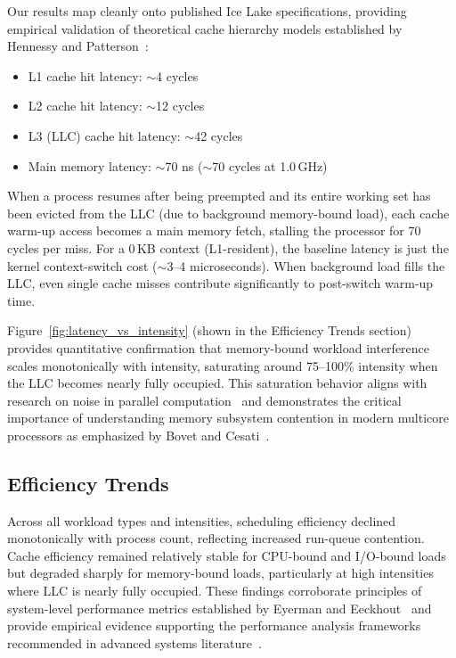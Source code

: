 \documentclass[conference]{IEEEtran}
\begin{document}
Our results map cleanly onto published Ice Lake specifications, providing
empirical validation of theoretical cache hierarchy models established by
Hennessy and Patterson~\cite{hennessy2019computer}:

\begin{itemize}
  \item L1 cache hit latency: $\sim$4 cycles
  \item L2 cache hit latency: $\sim$12 cycles
  \item L3 (LLC) cache hit latency: $\sim$42 cycles
  \item Main memory latency: $\sim$70 ns ($\sim$70 cycles at 1.0\,GHz)
\end{itemize}

When a process resumes after being preempted and its entire working set has
been evicted from the LLC (due to background memory-bound load), each cache
warm-up access becomes a main memory fetch, stalling the processor for 70
cycles per miss. For a 0\,KB context (L1-resident), the baseline latency is
just the kernel context-switch cost ($\sim$3--4 microseconds). When background
load fills the LLC, even single cache misses contribute significantly to
post-switch warm-up time.

Figure~\ref{fig:latency_vs_intensity} (shown in the Efficiency Trends section)
provides quantitative confirmation that memory-bound workload interference
scales monotonically with intensity, saturating around 75--100\% intensity when
the LLC becomes nearly fully occupied. This saturation behavior aligns with
research on noise in parallel computation~\cite{tsafrir2005noise} and
demonstrates the critical importance of understanding memory subsystem
contention in modern multicore processors as emphasized by Bovet and
Cesati~\cite{bovet2005understanding}.

\subsection{Efficiency Trends}

Across all workload types and intensities, scheduling efficiency declined
monotonically with process count, reflecting increased run-queue contention.
Cache efficiency remained relatively stable for CPU-bound and I/O-bound loads
but degraded sharply for memory-bound loads, particularly at high intensities
where LLC is nearly fully occupied. These findings corroborate principles of
system-level performance metrics established by Eyerman and
Eeckhout~\cite{eyerman2008system} and provide empirical evidence supporting
the performance analysis frameworks recommended in advanced systems
literature~\cite{gregg2013perf, corbet2009linux}.
\end{document}
